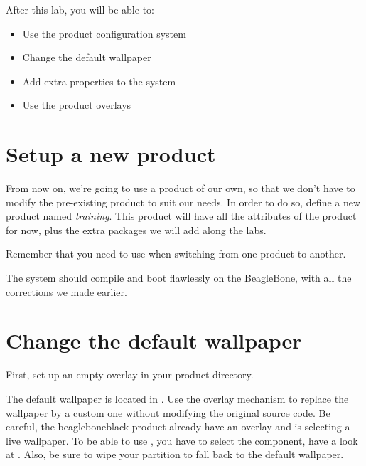 
After this lab, you will be able to:
\begin{itemize}
  \item Use the product configuration system
  \item Change the default wallpaper
  \item Add extra properties to the system
  \item Use the product overlays
\end{itemize}

\section{Setup a new product}

From now on, we're going to use a product of our own, so that we don't
have to modify the pre-existing  product to suit
our needs. In order to do so, define a new product named
\textit{training}. This product will have all the attributes of the
 product for now, plus the extra packages we
will add along the labs.

Remember that you need to use  when switching
from one product to another.

The system should compile and boot flawlessly on the BeagleBone, with
all the corrections we made earlier.

\section{Change the default wallpaper}

First, set up an empty overlay in your product directory.

The default wallpaper is located in .
Use the overlay mechanism to replace the wallpaper by a custom one without
modifying the original source code. Be careful, the beagleboneblack
product already have an overlay and is selecting a live wallpaper. To
be able to use , you have to select the
 component, have a look at
.  Also, be sure
to wipe your  partition to fall back to the
default wallpaper.
